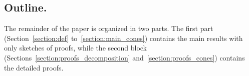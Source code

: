 \documentclass[11pt,a4paper]{amsart}
\renewcommand*{\geq}{\geqslant}
\renewcommand*{\leq}{\leqslant}
\theoremstyle{plain}
\theoremstyle{definition}
\newtheorem{problem}[theorem]{Problem}
\newcommand{\R}{\mathbb{R}}
\newcommand{\Q}{\mathbb{Q}}
\DeclareMathOperator{\cone}{cone}
\def\checkmark{\tikz\fill[scale=0.4](0,.35) -- (.25,0) -- (1,.7) -- (.25,.15) -- cycle;}
\def\faCrossed{$\times$}
\begin{document}

%



\subsection{Outline.}
The remainder of the paper is organized in two parts.
The first part (Section~\ref{section:def} to~\ref{section:main_cones}) contains the main results with only sketches of proofs, while the second block (Sections~\ref{section:proofs_decomposition} and~\ref{section:proofs_cones}) contains the detailed proofs.
\end{document}
